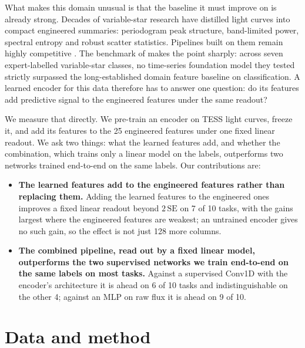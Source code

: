 \documentclass{article}
\begin{document}
What makes this domain unusual is that the baseline it must improve on is already strong. Decades of variable-star
research have distilled light curves into compact engineered summaries: periodogram peak structure,
band-limited power, spectral entropy and robust scatter statistics. Pipelines built on them remain
highly competitive \citep{audenaert2021}. The benchmark of \citet{li2025staremb} makes the point
sharply: across seven expert-labelled variable-star classes, no time-series foundation model they
tested strictly surpassed the long-established domain feature baseline on classification. A learned
encoder for this data therefore has to answer one question: do its features add predictive signal to
the engineered features under the same readout?

We measure that directly. We pre-train an encoder on TESS light curves, freeze it, and add its
features to the 25 engineered features under one fixed linear readout. We ask two things: what the
learned features add, and whether the combination, which trains only a linear model on the labels,
outperforms two networks trained end-to-end on the same labels. Our contributions are:

\begin{itemize}
\item \textbf{The learned features add to the engineered features rather than replacing them.}
Adding the learned features to the engineered ones improves a fixed linear readout beyond
$2\,\mathrm{SE}$ on 7 of 10 tasks, with the gains largest where the engineered features are weakest;
an untrained encoder gives no such gain, so the effect is not just 128 more columns.
\item \textbf{The combined pipeline, read out by a fixed linear model, outperforms the two
supervised networks we train end-to-end on the same labels on most tasks.} Against a supervised Conv1D with the
encoder's architecture it is ahead on 6
of 10 tasks and indistinguishable on the other 4; against an MLP on raw flux it is ahead on 9 of 10.
\end{itemize}

\section{Data and method}
\end{document}
